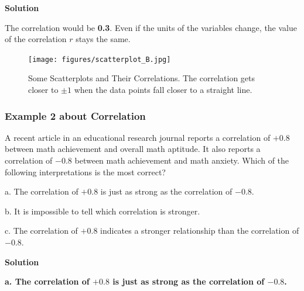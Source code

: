 \vspace{0.2cm}

\textbf{Solution}

\vspace{0.2cm}

\noindent The correlation would be \textbf{0.3}. Even if the units of the variables change, the value of the correlation $r$ stays the same.  

\begin{figure}[h!]
\centering
\texttt{[image: figures/scatterplot\_B.jpg]}
\caption{Some Scatterplots and Their Correlations. The correlation gets closer to $\pm1$ when the data points fall closer to a straight line.}
\label{fig:scatterplot_B.jpg}
\end{figure}

\subsubsection*{Example 2 about Correlation}
A recent article in an educational research journal reports a correlation of $+0.8$ between math achievement and overall math aptitude. It also reports a correlation of $-0.8$ between math achievement and math anxiety. Which of the following interpretations is the most correct? 

a. The correlation of $+0.8$ is just as strong as the correlation of $-0.8$.  

b. It is impossible to tell which correlation is stronger. 

c. The correlation of $+0.8$ indicates a stronger relationship than the correlation of $-0.8$.  

\vspace{0.2cm}

\textbf{Solution}

\vspace{0.2cm}

\noindent \textbf{a. The correlation of $+0.8$ is just as strong as the correlation of $-0.8$.} 




